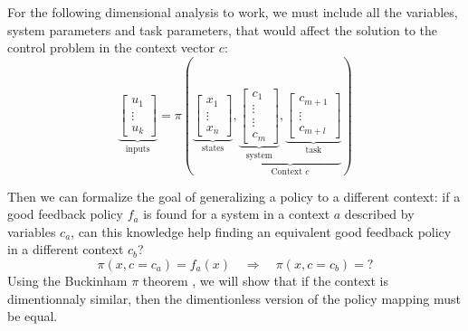 For the following dimensional analysis to work, we must include all the variables, system parameters and task parameters, that would affect the solution to the control problem in the context vector $c$:
\begin{equation}
\underbrace{\begin{bmatrix}
u_1 \\
\vdots \\
u_k
\end{bmatrix}}_{\text{inputs}}
=
\pi \left(
\underbrace{\begin{bmatrix}
x_1 \\
\vdots \\
x_n
\end{bmatrix}}_{\text{states}}
,
\underbrace{
\underbrace{\begin{bmatrix}
c_1 \\
\vdots \\
\vdots \\
c_m
\end{bmatrix}}_{\text{system}}
,
\underbrace{\begin{bmatrix}
c_{m+1} \\
\vdots \\
c_{m+l}
\end{bmatrix}}_{\text{task}}
}_{\text{Context $c$}}
\right) 
\label{eq:vectorpolicy}
\end{equation}


Then we can formalize the goal of generalizing a policy to a different context: if a good feedback policy $f_a$ is found for a system in a context $a$ described by variables $c_a$, can this knowledge help finding an equivalent good feedback policy in a different context $c_b$?
\begin{equation}
\pi \left(
x,
c = c_a
\right) = 
f_a \left(
x 
\right) 
\quad \Rightarrow \quad
\pi \left(
x,
c = c_b
\right) = ?
\end{equation}
Using the Buckinham $\pi$ theorem \cite{buckingham_physically_1914}, we will show that if the context is dimentionnaly similar, then the dimentionless version of the policy mapping must be equal.



